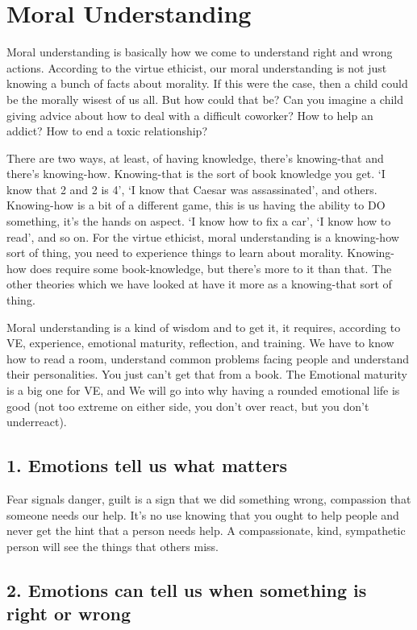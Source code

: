 \section{Moral Understanding}

Moral understanding is basically how we come to understand right and wrong actions. According to the virtue ethicist, our moral understanding is not just knowing a bunch of facts about morality. If this were the case, then a child could be the morally wisest of us all. But how could that be? Can you imagine a child giving advice about how to deal with a difficult coworker? How to help an addict? How to end a toxic relationship?

There are two ways, at least, of having knowledge, there’s knowing-that and there’s knowing-how. Knowing-that is the sort of book knowledge you get. ‘I know that 2 and 2 is 4’, ‘I know that Caesar was assassinated’, and others. Knowing-how is a bit of a different game, this is us having the ability to DO something, it’s the hands on aspect. ‘I know how to fix a car’, ‘I know how to read’, and so on. For the virtue ethicist, moral understanding is a knowing-how sort of thing, you need to experience things to learn about morality. Knowing-how does require some book-knowledge, but there’s more to it than that.  The other theories which we have looked at have it more as a knowing-that sort of thing.

Moral understanding is a kind of wisdom and to get it, it requires, according to VE, experience, emotional maturity, reflection, and training. We have to know how to read a room, understand common problems facing people and understand their personalities. You just can’t get that from a book. The Emotional maturity is a big one for VE, and We will go into why having a rounded emotional life is good (not too extreme on either side, you don’t over react, but you don’t underreact).
\subsection{1. Emotions tell us what matters}

Fear signals danger, guilt is a sign that we did something wrong, compassion that someone needs our help. It’s no use knowing that you ought to help people and never get the hint that a person needs help. A compassionate, kind, sympathetic person will see the things that others miss.
\subsection{2. Emotions can tell us when something is right or wrong}

